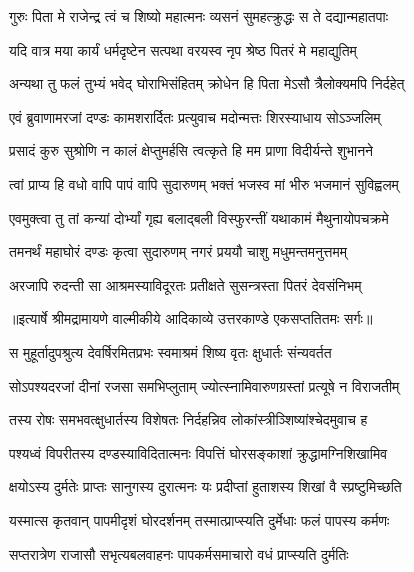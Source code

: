\twolineshloka
{गुरुः पिता मे राजेन्द्र त्वं च शिष्यो महात्मनः}
{व्यसनं सुमहत्क्रुद्धः स ते दद्यान्महातपाः} %

\twolineshloka
{यदि वात्र मया कार्यं धर्मदृष्टेन सत्पथा}
{वरयस्व नृप श्रेष्ठ पितरं मे महाद्युतिम्} %

\twolineshloka
{अन्यथा तु फलं तुभ्यं भवेद् घोराभिसंहितम्}
{क्रोधेन हि पिता मेऽसौ त्रैलोक्यमपि निर्दहेत्} %

\twolineshloka
{एवं ब्रुवाणामरजां दण्डः कामशरार्दितः}
{प्रत्युवाच मदोन्मत्तः शिरस्याधाय सोऽञ्जलिम्} %

\twolineshloka
{प्रसादं कुरु सुश्रोणि न कालं क्षेप्तुमर्हसि}
{त्वत्कृते हि मम प्राणा विदीर्यन्ते शुभानने} %

\twolineshloka
{त्वां प्राप्य हि वधो वापि पापं वापि सुदारुणम्}
{भक्तं भजस्व मां भीरु भजमानं सुविह्वलम्} %

\twolineshloka
{एवमुक्त्वा तु तां कन्यां दोर्भ्यां गृह्य बलाद्बली}
{विस्फुरन्तीं यथाकामं मैथुनायोपचक्रमे} %

\twolineshloka
{तमनर्थं महाघोरं दण्डः कृत्वा सुदारुणम्}
{नगरं प्रययौ चाशु मधुमन्तमनुत्तमम्} %

\twolineshloka
{अरजापि रुदन्ती सा आश्रमस्याविदूरतः}
{प्रतीक्षते सुसन्त्रस्ता पितरं देवसंनिभम्} %


{॥इत्यार्षे श्रीमद्रामायणे वाल्मीकीये आदिकाव्ये उत्तरकाण्डे एकसप्ततितमः सर्गः॥}


\twolineshloka
{स मुहूर्तादुपश्रुत्य देवर्षिरमितप्रभः}
{स्वमाश्रमं शिष्य वृतः क्षुधार्तः संन्यवर्तत} %

\twolineshloka
{सोऽपश्यदरजां दीनां रजसा समभिप्लुताम्}
{ज्योत्स्नामिवारुणग्रस्तां प्रत्यूषे न विराजतीम्} %

\twolineshloka
{तस्य रोषः समभवत्क्षुधार्तस्य विशेषतः}
{निर्दहन्निव लोकांस्त्रीञ्शिष्यांश्चेदमुवाच ह} %

\twolineshloka
{पश्यध्वं विपरीतस्य दण्डस्याविदितात्मनः}
{विपत्तिं घोरसङ्काशां क्रुद्धामग्निशिखामिव} %

\twolineshloka
{क्षयोऽस्य दुर्मतेः प्राप्तः सानुगस्य दुरात्मनः}
{यः प्रदीप्तां हुताशस्य शिखां वै स्प्रष्टुमिच्छति} %

\twolineshloka
{यस्मात्स कृतवान् पापमीदृशं घोरदर्शनम्}
{तस्मात्प्राप्स्यति दुर्मेधाः फलं पापस्य कर्मणः} %

\twolineshloka
{सप्तरात्रेण राजासौ सभृत्यबलवाहनः}
{पापकर्मसमाचारो वधं प्राप्स्यति दुर्मतिः} %


